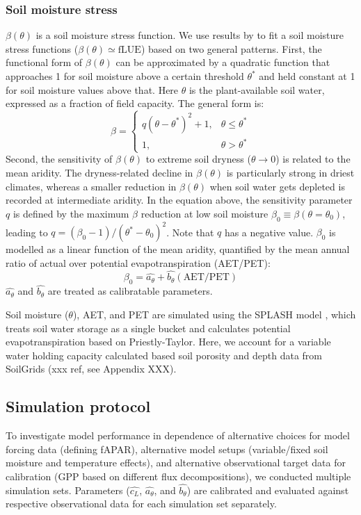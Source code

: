 \documentclass{myreport}
\begin{document}
\subsubsection{Soil moisture stress}
$\beta(\theta)$ is a soil moisture stress function. We use results by \cite{stocker18newphyt} to fit a soil moisture stress functions ($\beta(\theta)\simeq\text{fLUE}$) based on two general patterns. First, the functional form of $\beta(\theta)$ can be approximated by a quadratic function that approaches 1 for soil moisture above a certain threshold $\theta^{\ast}$ and held constant at 1 for soil moisture values above that. Here $\theta$ is the plant-available soil water, expressed as a fraction of field capacity. The general form is:
\begin{equation}
    \beta =
\begin{cases}
    q(\theta - \theta^{\ast})^2 + 1,& \theta \leq \theta^{\ast}\\
    1,              & \theta > \theta^{\ast}
\end{cases}
\end{equation}
Second, the sensitivity of $\beta(\theta)$ to extreme soil dryness ($\theta \rightarrow 0$) is related to the mean aridity. The dryness-related decline in $\beta(\theta)$ is particularly strong in driest climates, whereas a smaller reduction in $\beta(\theta)$ when soil water gets depleted is recorded at intermediate aridity. In the equation above, the sensitivity parameter $q$ is defined by the maximum $\beta$ reduction at low soil moisture $\beta_0\equiv\beta(\theta=\theta_0)$, leading to $q=(\beta_0-1)/(\theta^{\ast}-\theta_0)^2$. Note that $q$ has a negative value. $\beta_0$ is modelled as a linear function of the mean aridity, quantified by the mean annual ratio of actual over potential evapotranspiration (AET/PET):
\begin{equation}
\beta_0 = \widehat{a_{\theta}} + \widehat{b_{\theta}} (\text{AET}/\text{PET})
\end{equation}
$\widehat{a_{\theta}}$ and $\widehat{b_{\theta}}$ are treated as calibratable parameters. 

Soil moisture ($\theta$), AET, and PET are simulated using the SPLASH model \cite{davis17}, which treats soil water storage as a single bucket and calculates potential evapotranspiration based on Priestly-Taylor. Here, we account for a variable water holding capacity calculated based soil porosity and depth data from SoilGrids (xxx ref, see Appendix XXX).

\subsection{Simulation protocol}
\label{sec:protocol}
To investigate model performance in dependence of alternative choices for model forcing data (defining fAPAR), alternative model setups (variable/fixed soil moisture and temperature effects), and alternative observational target data for calibration (GPP based on different flux decompositions), we conducted multiple simulation sets. Parameters ($\widehat{c_L}$, $\widehat{a_{\theta}}$, and $\widehat{b_{\theta}}$) are calibrated and evaluated against respective observational data for each simulation set separately.
\end{document}
